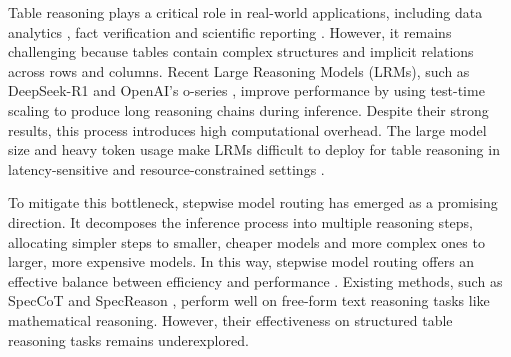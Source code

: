 \documentclass[11pt]{article}
\begin{document}
Table reasoning plays a critical role in real-world applications, including data analytics \citep{zhao2024docmath}, fact verification \citep{parikh2020totto} and scientific reporting \citep{newman2024arxivdigestables}.
However, it remains challenging because tables contain complex structures and implicit relations across rows and columns. Recent Large Reasoning Models (LRMs), such as DeepSeek-R1 \citep{guo2025deepseek} and OpenAI's o-series \citep{pfister2025understanding}, improve performance by using test-time scaling to produce long reasoning chains during inference. Despite their strong results, this process introduces high computational overhead. The large model size and heavy token usage make LRMs difficult to deploy for table reasoning in latency-sensitive and resource-constrained settings \citep{zeng2026glimprouter}.

To mitigate this bottleneck, stepwise model routing \citep{shi-etal-2025-speccot,lee2025confidence} has emerged as a promising direction. It decomposes the inference process into multiple reasoning steps, allocating simpler steps to smaller, cheaper models and more complex ones to larger, more expensive models. In this way, stepwise model routing offers an effective balance between efficiency and performance \citep{fernandez2026radar}. Existing methods, such as SpecCoT \citep{shi-etal-2025-speccot} and SpecReason \citep{pan2025specreason}, perform well on free-form text reasoning tasks like mathematical reasoning. However, their effectiveness on structured table reasoning tasks remains underexplored. 
\end{document}
